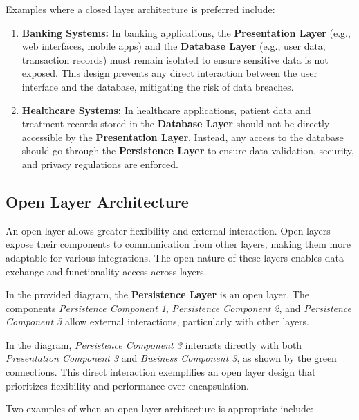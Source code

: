 Examples where a closed layer architecture is preferred include:
\begin{enumerate}
	\item \textbf{Banking Systems:} In banking applications, the \textbf{Presentation Layer} (e.g., web interfaces, mobile apps) and the \textbf{Database Layer} (e.g., user data, transaction records) must remain isolated to ensure sensitive data is not exposed. This design prevents any direct interaction between the user interface and the database, mitigating the risk of data breaches.
	\item \textbf{Healthcare Systems:} In healthcare applications, patient data and treatment records stored in the \textbf{Database Layer} should not be directly accessible by the \textbf{Presentation Layer}. Instead, any access to the database should go through the \textbf{Persistence Layer} to ensure data validation, security, and privacy regulations are enforced.
\end{enumerate}

\subsection{Open Layer Architecture}

An open layer allows greater flexibility and external interaction. Open layers expose their components to communication from other layers, making them more adaptable for various integrations. The open nature of these layers enables data exchange and functionality access across layers.

In the provided diagram, the \textbf{Persistence Layer} is an open layer. The components \textit{Persistence Component 1}, \textit{Persistence Component 2}, and \textit{Persistence Component 3} allow external interactions, particularly with other layers.

In the diagram, \textit{Persistence Component 3} interacts directly with both \textit{Presentation Component 3} and \textit{Business Component 3}, as shown by the green connections. This direct interaction exemplifies an open layer design that prioritizes flexibility and performance over encapsulation.

Two examples of when an open layer architecture is appropriate include:

